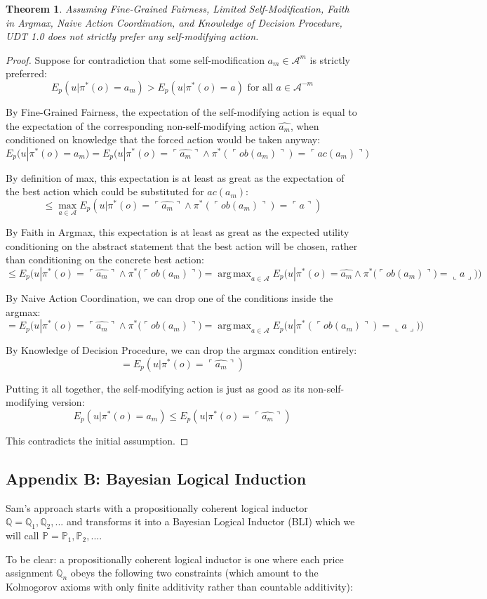 \documentclass{article}
\newcommand{\qq}[1]{\ulcorner #1 \urcorner}
\newtheorem{theorem}{Theorem}
\DeclareMathOperator*{\argmax}{arg\,max}
\begin{document}
\begin{theorem}
Assuming Fine-Grained Fairness, Limited Self-Modification, Faith in Argmax, Naive Action Coordination, and Knowledge of Decision Procedure, UDT 1.0 does not strictly prefer any self-modifying action.
\end{theorem}

\begin{proof}
Suppose for contradiction that some self-modification $a_m \in \mathcal{A}^m$ is strictly preferred:
$$ E_p(u|\pi^*(o)=a_m) > E_p(u|\pi^*(o)=a) \text{ for all } a \in \mathcal{A}^{-m} $$

By Fine-Grained Fairness, the expectation of the self-modifying action is equal to the expectation of the corresponding non-self-modifying action $\hat{a_m}$, when conditioned on knowledge that the forced action would be taken anyway:
$$ E_p(u|\pi^*(o)=a_m) = E_p\big(u|\pi^*(o)=\qq{\hat {a_m}} \wedge \pi^*(\qq{ob(a_m)})=\qq{ac(a_m)}\big) $$

By definition of max, this expectation is at least as great as the expectation of the best action which could be substituted for $ac(a_m)$:
$$ \leq \max_{a \in \mathcal{A}} E_p(u|\pi^*(o)=\qq{\hat {a_m}} \wedge \pi^*(\qq{ob(a_m)})=\qq{a}) $$

By Faith in Argmax, this expectation is at least as great as the expected utility conditioning on the abstract statement that the best action will be chosen, rather than conditioning on the concrete best action:
$$ \leq E_p\Big(u|\pi^*(o)=\qq{\hat {a_m}} \wedge \pi^*\big(\qq{ob(a_m)}\big)= \argmax_{a \in \mathcal{A}} E_p\big(u|\pi^*(o)=\hat {a_m} \wedge \pi^*\big(\qq{ob ( a_m ) }\big)=\llcorner a\lrcorner \big)\Big) $$

By Naive Action Coordination, we can drop one of the conditions inside the argmax:
$$ = E_p \Big(u|\pi^*(o)=\qq{\hat {a_m}} \wedge \pi^*\big(\qq{ob(a_m)}\big)= \argmax_{a \in \mathcal{A}} E_p \big(u| \pi^*(\qq{ob(a_m)})=\llcorner a\lrcorner\big)\Big) $$

By Knowledge of Decision Procedure, we can drop the argmax condition entirely:
$$ = E_p(u|\pi^*(o)=\qq{\hat {a_m}}) $$

Putting it all together, the self-modifying action is just as good as its non-self-modifying version:
$$ E_p(u|\pi^*(o)=a_m) \leq E_p(u|\pi^*(o)=\qq{\hat {a_m}}) $$

This contradicts the initial assumption.
\end{proof}

\appendix

\subsection*{Appendix B: Bayesian Logical Induction}

Sam's approach starts with a propositionally coherent logical inductor $\mathbb{Q}=\mathbb{Q}_1, \mathbb{Q}_2,...$ and transforms it into a Bayesian Logical Inductor (BLI) which we will call $\mathbb{P}=\mathbb{P}_1, \mathbb{P}_2, ...$. 

To be clear: a propositionally coherent logical inductor is one where each price assignment $\mathbb{Q}_n$ obeys the following two constraints (which amount to the Kolmogorov axioms with only finite additivity rather than countable additivity):
\end{document}
